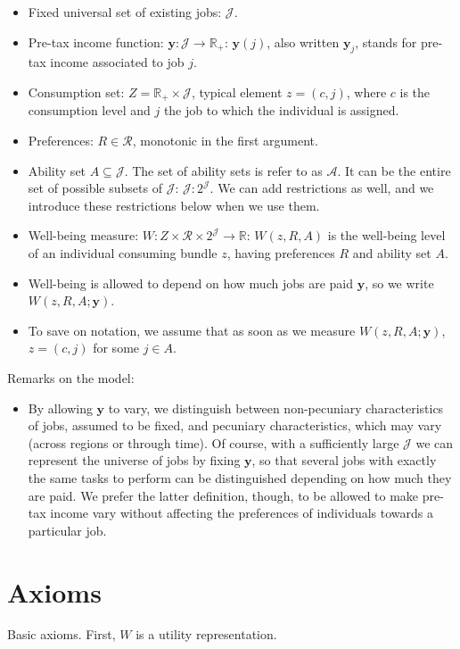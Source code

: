 \documentclass[12pt,thmsb]{article}
\begin{document}
\begin{itemize}
    \item Fixed universal set of existing jobs: $\mathcal{J}$.
    \item Pre-tax income function: $\mathbf{y}:\mathcal{J}\rightarrow \mathbb{R}_{+}$: $\mathbf{y}(j)$, also written $\mathbf{y}_j$, stands for pre-tax income associated to job $j$. 
    \item Consumption set: $Z=\mathbb{R}_{+}\times \mathcal{J}$, typical element $z=(c,j)$, where $c$ is the consumption level and $j$ the job to which the individual is assigned.
    \item Preferences: $R\in\mathcal{R}$, monotonic in the first argument.
    \item Ability set $A\subseteq \mathcal{J}$. The set of ability sets is refer to as $\mathcal{A}$. It can be the entire set of possible subsets of $\mathcal{J}$: $\mathcal{J}:2^{\mathcal{J}}$. We can add restrictions as well, and we introduce these restrictions below when we use them.
    \item Well-being measure: $W: Z\times \mathcal{R} \times 2^{\mathcal{J}}\rightarrow \mathbb{R}$: $W(z,R,A)$ is the well-being level of an individual consuming bundle $z$, having preferences $R$ and ability set $A$.
    \item Well-being is allowed to depend on how much jobs are paid $\mathbf{y}$, so we write $W(z,R,A;\mathbf{y})$.
    \item To save on notation, we assume that as soon as we measure $W(z,R,A;\mathbf{y})$, $z=(c,j)$ for some $j\in A$.
\end{itemize}
Remarks on the model:
\begin{itemize}
  \item By allowing $\mathbf{y}$ to vary, we distinguish between non-pecuniary characteristics of jobs, assumed to be fixed, and pecuniary characteristics, which may vary (across regions or through time). Of course, with a sufficiently large $\mathcal{J}$ we can represent the universe of jobs by fixing $\mathbf{y}$, so that several jobs with exactly the same tasks to perform can be distinguished depending on how much they are paid. We prefer the latter definition, though, to be allowed to make pre-tax income vary without affecting the preferences of individuals towards a particular job.
\end{itemize}

\section{Axioms}
Basic axioms. First, $W$ is a utility representation.
\end{document}
